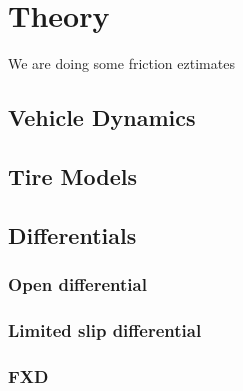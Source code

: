 \chapter{Theory}


We are doing some friction eztimates

\section{Vehicle Dynamics}

\section{Tire Models}

\section{Differentials}

\subsection{Open differential}

\subsection{Limited slip differential}

\subsection{FXD}